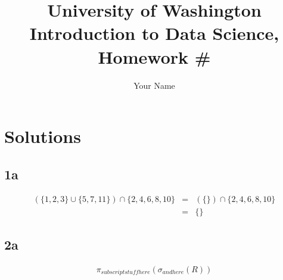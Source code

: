 \documentclass{article}
\author{Your Name}
\title{University of Washington Introduction to Data Science, Homework \# }
\begin{document}
\maketitle
\section*{Solutions}
\subsection*{1a}
\begin{eqnarray}
(\{1,2,3\}  \cup \{5,7,11\}) \cap \{2,4,6,8,10\} & = & (\{\}) \cap \{2,4,6,8,10\}   \nonumber \\
 								  &=&\{\} \nonumber 
\end{eqnarray}
 


\subsection*{2a}
 \begin{eqnarray}
\pi_{subscript stuff here}(\sigma_{and here}(R)) \nonumber 
\end{eqnarray}
 
\end{document}

